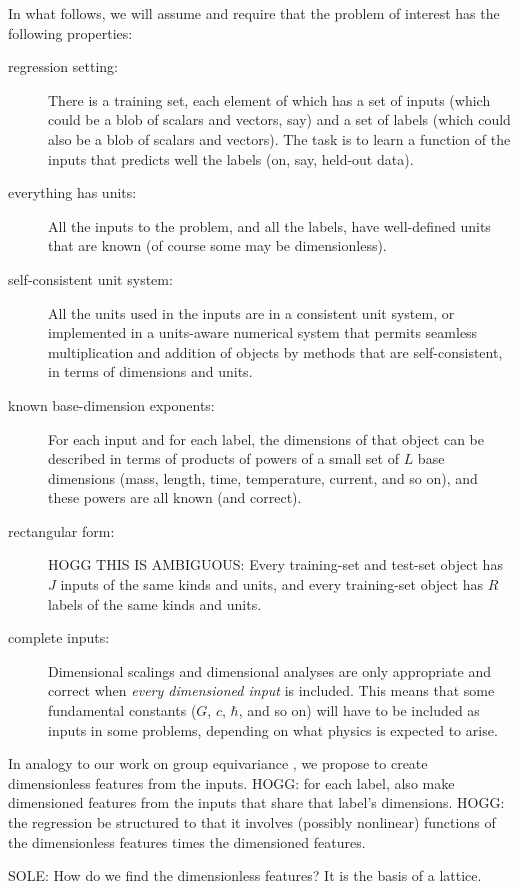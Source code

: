 \documentclass[12pt, letterpaper]{article}
\begin{document}
In what follows, we will assume and require that the problem of interest has the following properties:
\begin{description}
    \item[regression setting:] There is a training set, each element of which has a set of inputs (which could be a blob of scalars and vectors, say) and a set of labels (which could also be a blob of scalars and vectors). The task is to learn a function of the inputs that predicts well the labels (on, say, held-out data).
    \item[everything has units:] All the inputs to the problem, and all the labels, have well-defined units that are known (of course some may be dimensionless).
    \item[self-consistent unit system:] All the units used in the inputs are in a consistent unit system, or implemented in a units-aware numerical system that permits seamless multiplication and addition of objects by methods that are self-consistent, in terms of dimensions and units.
    \item[known base-dimension exponents:] For each input and for each label, the dimensions of that object can be described in terms of products of powers of a small set of $L$ base dimensions (mass, length, time, temperature, current, and so on), and these powers are all known (and correct).
    \item[rectangular form:] HOGG THIS IS AMBIGUOUS: Every training-set and test-set object has $J$ inputs of the same kinds and units, and every training-set object has $R$ labels of the same kinds and units.
    \item[complete inputs:] Dimensional scalings and dimensional analyses are only appropriate and correct when \emph{every dimensioned input} is included. This means that some fundamental constants ($G$, $c$, $\hbar$, and so on) will have to be included as inputs in some problems, depending on what physics is expected to arise.
\end{description}

In analogy to our work on group equivariance \cite{villar, yao}, we propose to create dimensionless features from the inputs.
HOGG: for each label, also make dimensioned features from the inputs that share that label's dimensions.
HOGG: the regression be structured to that it involves (possibly nonlinear) functions of the dimensionless features times the dimensioned features.

SOLE: How do we find the dimensionless features? It is the basis of a lattice.
\end{document}
